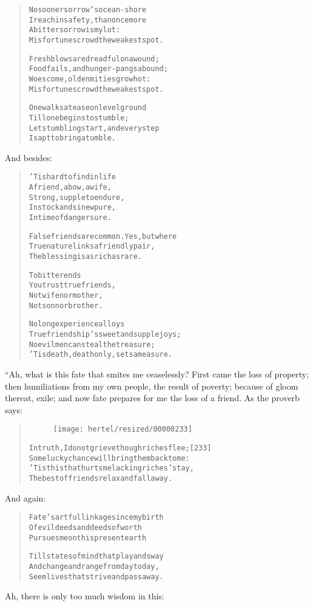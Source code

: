 \documentclass[article, twoside, 10pt]{memoir}
\renewenvironment{verbatim}{%
\begin{quote}%
\vskip -10pt%
\begin{alltt}\normalfont\small}{\end{alltt}%
\end{quote}%
\vskip -10pt
} %
\begin{document}
\begin{verbatim}
No sooner sorrow's ocean-shore
I reach in safety, than once more
A bitter sorrow is my lot:
Misfortunes crowd the weakest spot.

Fresh blows are dreadful on a wound;
Food fails, and hunger-pangs abound;
Woes come, old enmities grow hot:
Misfortunes crowd the weakest spot.

One walks at ease on level ground
    Till one begins to stumble;
Let stumbling start, and every step
    Is apt to bring a tumble.
\end{verbatim}
And besides:

\begin{verbatim}
'Tis hard to find in life
A friend, a bow, a wife,
Strong, supple to endure,
In stock and sinew pure,
In time of danger sure.

False friends are common. Yes, but where
True nature links a friendly pair,
The blessing is as rich as rare.

To bitter ends
You trust true friends,
Not wife nor mother,
Not son nor brother.

No long experience alloys
True friendship's sweet and supple joys;
No evil men can steal the treasure;
'Tis death, death only, sets a measure.
\end{verbatim}
“Ah, what is this fate that smites me ceaselessly? First came the
loss of property; then humiliations from my own people, the result
of poverty; because of gloom thereat, exile; and now fate prepares
for me the loss of a friend. As the proverb says:

\begin{verbatim}
\begin{figure}[p]\texttt{[image: hertel/resized/00000233]}\end{figure}In truth, I do not grieve though riches flee;           [233]
Some lucky chance will bring them back to me:
'Tis this that hurts me{\textemdash}lacking riches' stay,
The best of friends relax and fall away.
\end{verbatim}
And again:

\begin{verbatim}
Fate's artful linkage since my birth
Of evil deeds and deeds of worth
Pursues me on this present earth

Till states of mind that play and sway
And change and range from day to day,
Seem lives that strive and pass away.
\end{verbatim}
Ah, there is only too much wisdom in this:
\end{document}
